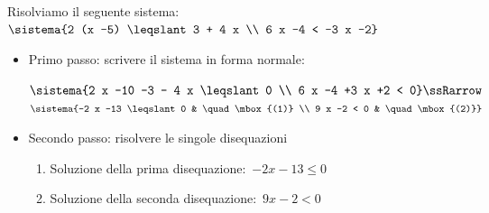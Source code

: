 \newcommand{\soldis}[4]{%
  \begin{minipage}{.45\textwidth}
    E.A.:~\(#1=0 \Rightarrow #2\)
  \end{minipage}
  \begin{minipage}{.25\textwidth}
    F.A.:~\(y=#1 \rightarrow \)
  \end{minipage}
  \begin{minipage}{.30\textwidth}
    #3
  \end{minipage}
  \begin{center} #4 \end{center}
}

\begin{esempio}{}{}

Risolviamo il seguente sistema:
\(\sistema{2 (x -5) \leqslant 3 + 4 x \\
6 x -4 < -3 x -2}\)
\begin{itemize} [left=0mm]%
\item Primo passo: scrivere il sistema in forma normale:

\(\sistema{2 x -10 -3 - 4 x \leqslant 0 \\
6 x -4 +3 x +2 < 0} \ssRarrow\)
\(\sistema{-2 x -13 \leqslant 0 & \quad \mbox{(1)} \\
  9 x -2 < 0 & \quad \mbox{(2)}}\)

\item Secondo passo: risolvere le singole disequazioni

\begin{enumerate} [left=0mm, label=({\arabic*})]
\item 
Soluzione della prima disequazione:~\(-2 x -13 \leqslant 0\)

\hspace*{-10mm} 
\vspace{-10mm}
{}

\item Soluzione della seconda disequazione:~\(9 x -2 < 0\)

\hspace*{-10mm} 
\vspace{-10mm}
{}
\end{enumerate}


\end{itemize}
\end{esempio}
